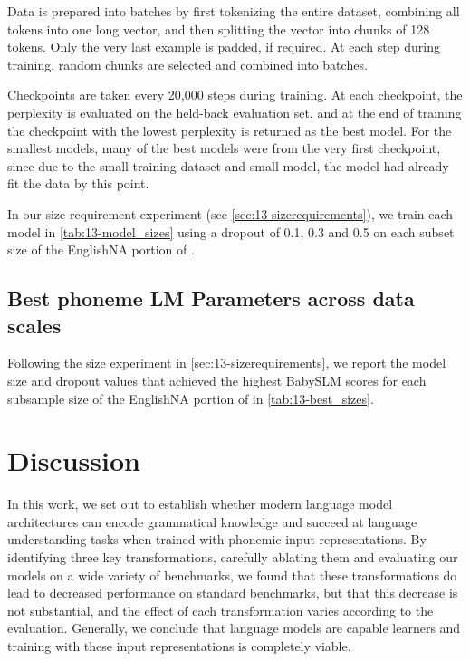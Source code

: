Data is prepared into batches by first tokenizing the entire dataset, combining all tokens into one long vector, and then splitting the vector into chunks of 128 tokens. Only the very last example is padded, if required. At each step during training, random chunks are selected and combined into batches. 

Checkpoints are taken every 20,000 steps during training. At each checkpoint, the perplexity is evaluated on the held-back evaluation set, and at the end of training the checkpoint with the lowest perplexity is returned as the best model. For the smallest models, many of the best models were from the very first checkpoint, since due to the small training dataset and small model, the model had already fit the data by this point.

In our size requirement experiment (see \cref{sec:13-sizerequirements}), we train each model in \cref{tab:13-model_sizes} using a dropout of 0.1, 0.3 and 0.5 on each subset size of the EnglishNA portion of \ipachildes.

\subsection{Best phoneme LM Parameters across data scales}\label{sec:13-best-model-parameters}


Following the size experiment in \cref{sec:13-sizerequirements}, we report the model size and dropout values that achieved the highest BabySLM scores for each subsample size of the EnglishNA portion of \ipachildes in \cref{tab:13-best_sizes}. 



\section{Discussion}
\label{sec:14-gap}

In this work, we set out to establish whether modern language model architectures can encode grammatical knowledge and succeed at language understanding tasks when trained with phonemic input representations. By identifying three key transformations, carefully ablating them and evaluating our models on a wide variety of benchmarks, we found that these transformations do lead to decreased performance on standard benchmarks, but that this decrease is not substantial, and the effect of each transformation varies according to the evaluation. Generally, we conclude that language models are capable learners and training with these input representations is completely viable.

